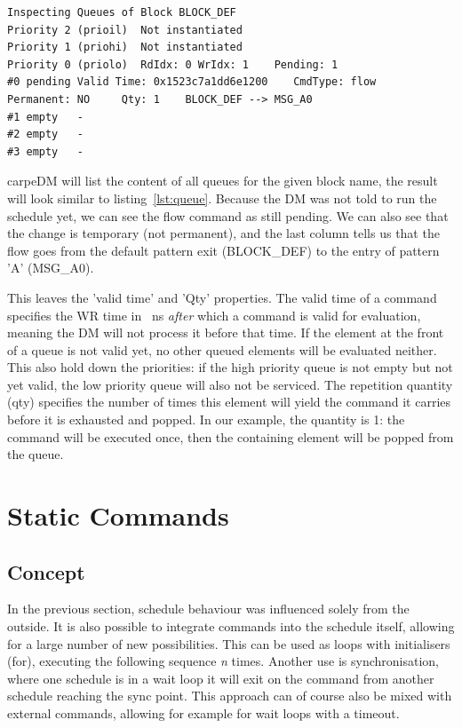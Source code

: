 \begin{lstlisting}[style = customshell, caption={Output of dm-cmd queue inspection}, label={lst:queue}]
Inspecting Queues of Block BLOCK_DEF
Priority 2 (prioil)  Not instantiated
Priority 1 (priohi)  Not instantiated
Priority 0 (priolo)  RdIdx: 0 WrIdx: 1    Pending: 1
#0 pending Valid Time: 0x1523c7a1dd6e1200    CmdType: flow    Permanent: NO     Qty: 1    BLOCK_DEF --> MSG_A0
#1 empty   -
#2 empty   -
#3 empty   -
\end{lstlisting}

carpeDM will list the content of all queues for the given block name, the result will look similar to listing~\ref{lst:queue}.
Because the DM was not told to run the schedule yet, we can see the flow command as still pending. We can also see that the change is temporary (not permanent),
and the last column tells us that the flow goes from the default pattern exit (BLOCK\_DEF) to the entry of pattern 'A' (MSG\_A0).

This leaves the 'valid time' and 'Qty' properties. The valid time of a command specifies the WR time in \SI{}{\nano\second} \emph{after} which a command
is valid for evaluation, meaning the DM will not process it before that time. If the element at the front of a queue is not valid yet,
no other queued elements will be evaluated neither. This also hold down the priorities: if the high priority queue is not empty but not yet valid,
the low priority queue will also not be serviced.
\label{ssec:exdefpat}
The repetition quantity (qty) specifies the number of times this element will yield the command it
carries before it is exhausted and popped. In our example, the quantity is 1: the command will be executed once, then the containing element will be popped from the queue.

\newpage
\section{Static Commands}
\subsection{Concept}
In the previous section, schedule behaviour was influenced solely from the outside. It is also possible to integrate commands into the schedule itself, allowing for a large number of new possibilities.
This can be used as loops with initialisers (for), executing the following sequence \emph{n} times. Another use is synchronisation, where one schedule is in a wait loop it will exit on the command from another schedule reaching the sync point. This approach can of course also be mixed with external commands, allowing for example for wait loops with a timeout.
